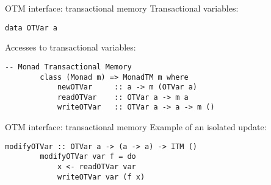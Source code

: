\documentclass[beamer={noamsthm,10pt},target=bach]{thud}[2014/03/11]
\begin{document}
        
        
        
        
        
        


\begin{frame}[fragile]{OTM interface: transactional memory}
Transactional variables:
\begin{Verbatim}[tabsize=3, gobble=2]
        data OTVar a
\end{Verbatim}
Accesses to transactional variables:
\begin{Verbatim}[tabsize=3, gobble=2]
        -- Monad Transactional Memory
        class (Monad m) => MonadTM m where
            newOTVar     :: a -> m (OTVar a)
            readOTVar    :: OTVar a -> m a
            writeOTVar   :: OTVar a -> a -> m ()
\end{Verbatim}
\end{frame}

\begin{frame}[fragile]{OTM interface: transactional memory}
Example of an isolated update:
\begin{Verbatim}[tabsize=3, gobble=2]
        modifyOTVar :: OTVar a -> (a -> a) -> ITM ()
        modifyOTVar var f = do
            x <- readOTVar var
            writeOTVar var (f x)
\end{Verbatim}
\end{frame}
\end{document}
